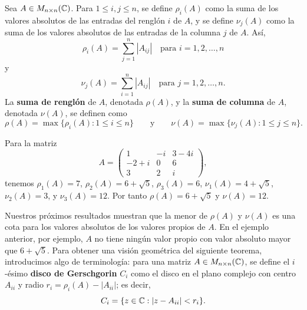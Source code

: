 \documentclass[12pt,a4paper]{book}
\begin{document}
    \begin{definicion}
        Sea $A\in M_{n\times n}(\mathbb{C})$. Para $1\leq i,j\leq n$, se define $\rho_i(A)$ como la suma de los valores absolutos de las entradas del renglón $i$ de $A$, y se define $\nu_j(A)$ como la suma de los valores absolutos de las entradas de la columna $j$ de $A$. Así,
        \begin{equation*}
            \rho_i(A)=\sum_{j=1}^{n}|A_{ij}| \quad\text{para } i=1,2,\dots,n
        \end{equation*}
        y
        \begin{equation*}
            \nu_j(A)=\sum_{i=1}^{n}|A_{ij}| \quad\text{para } j=1,2,\dots,n.
        \end{equation*}
        La \textbf{suma de renglón} de $A$, denotada $\rho(A)$, y la \textbf{suma de columna} de $A$, denotada $\nu(A)$, se definen como
        \begin{equation*}
            \rho(A)=\max\{\rho_i(A):1\leq i\leq n\} \qquad\text{y}\qquad \nu(A)=\max\{\nu_j(A):1\leq j\leq n\}.
        \end{equation*}
    \end{definicion}

    \begin{ejemplo}
        Para la matriz
        \begin{equation*}
            A=\begin{pmatrix}1&-i&3-4i\\-2+i&0&6\\3&2&i\end{pmatrix},
        \end{equation*}
        tenemos $\rho_1(A)=7$, $\rho_2(A)=6+\sqrt5$, $\rho_3(A)=6$, $\nu_1(A)=4+\sqrt5$, $\nu_2(A)=3$, y $\nu_3(A)=12$. Por tanto $\rho(A)=6+\sqrt5$ y $\nu(A)=12$.
    \end{ejemplo}

    Nuestros próximos resultados muestran que la menor de $\rho(A)$ y $\nu(A)$ es una cota para los valores absolutos de los valores propios de $A$. En el ejemplo anterior, por ejemplo, $A$ no tiene ningún valor propio con valor absoluto mayor que $6+\sqrt5$. Para obtener una visión geométrica del siguiente teorema, introducimos algo de terminología: para una matriz $A\in M_{n\times n}(\mathbb{C})$, se define el $i$-ésimo \textbf{disco de Gerschgorin} $C_i$ como el disco en el plano complejo con centro $A_{ii}$ y radio $r_i=\rho_i(A)-|A_{ii}|$; es decir,
    \begin{equation*}
        C_i=\{z\in\mathbb{C}:|z-A_{ii}|<r_i\}.
    \end{equation*}
\end{document}
